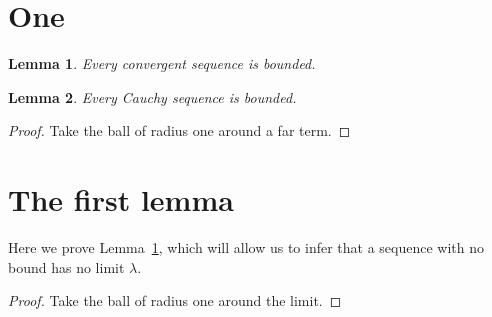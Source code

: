 \documentclass{article}
\newtheorem{lemma}{Lemma}[section]
\begin{document}
\section{One}

\begin{lemma}\label{l:one}
Every convergent sequence is bounded.
\end{lemma}

\begin{lemma}\label{l:two}
Every Cauchy sequence is bounded.
\end{lemma}

\begin{proof}
Take the ball of radius one around a far term.
\end{proof}

\section{The first lemma}

Here we prove Lemma~\ref{l:one}, which will allow us to infer that a
sequence with no bound has no limit $\lambda$.

\begin{proof}
Take the ball of radius one around the limit.
\end{proof}
\end{document}
